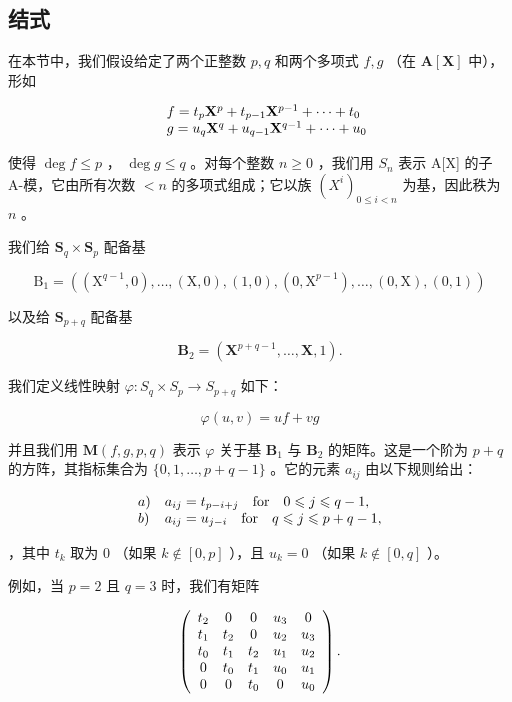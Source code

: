 \subsection{结式}

在本节中，我们假设给定了两个正整数 \(p, q\) 和两个多项式 \(f, g\) （在 \(\mathbf{A}[\mathbf{X}]\) 中），形如

\[
\begin{array}{r l} & {f = t _ {p} \mathbf {X} ^ {p} + t _ {p - 1} \mathbf {X} ^ {p - 1} + \dots + t _ {0}} \\ & {g = u _ {q} \mathbf {X} ^ {q} + u _ {q - 1} \mathbf {X} ^ {q - 1} + \dots + u _ {0}} \end{array}
\]

使得 \(\deg f \leqslant p\) ， \(\deg g \leqslant q\) 。对每个整数 \(n \geqslant 0\) ，我们用 \(S_n\) 表示 A{[}X{]} 的子 A-模，它由所有次数 \(< n\) 的多项式组成；它以族 \((X^i)_{0 \leqslant i < n}\) 为基，因此秩为 \(n\) 。

我们给 \(\mathbf{S}_q\times \mathbf{S}_p\) 配备基

\[
\mathrm{B} _ {1} = \left(\left(\mathrm{X} ^ {q - 1}, 0\right), \dots , (\mathrm{X}, 0), (1, 0), \left(0, \mathrm{X} ^ {p - 1}\right), \dots , (0, \mathrm{X}), (0, 1)\right)
\]

以及给 \(\mathbf{S}_{p + q}\) 配备基

\[
\mathbf {B} _ {2} = \left(\mathbf {X} ^ {p + q - 1}, \dots , \mathbf {X}, 1\right).
\]

我们定义线性映射 \(\varphi : S_q \times S_p \to S_{p + q}\) 如下：

\[
\varphi (u, v) = u f + v g
\]

并且我们用 \(\mathbf{M}(f,g,p,q)\) 表示 \(\varphi\) 关于基 \(\mathbf{B}_1\) 与 \(\mathbf{B}_2\) 的矩阵。这是一个阶为 \(p + q\) 的方阵，其指标集合为 \(\{0,1,\dots,p + q - 1\}\) 。它的元素 \(a_{ij}\) 由以下规则给出：

\[
\begin{array}{l l} a) & a _ {i j} = t _ {p - i + j} \quad \text {for} \quad 0 \leqslant j \leqslant q - 1, \\ b) & a _ {i j} = u _ {j - i} \quad \text {for} \quad q \leqslant j \leqslant p + q - 1, \end{array}
\]

，其中 \(t_k\) 取为 0 （如果 \(k \notin [0, p]\) ），且 \(u_k = 0\) （如果 \(k \notin [0, q]\) ）。

例如，当 \(p = 2\) 且 \(q = 3\) 时，我们有矩阵

\[
\left( \begin{array}{c c c c c} t _ {2} & 0 & 0 & u _ {3} & 0 \\ t _ {1} & t _ {2} & 0 & u _ {2} & u _ {3} \\ t _ {0} & t _ {1} & t _ {2} & u _ {1} & u _ {2} \\ 0 & t _ {0} & t _ {1} & u _ {0} & u _ {1} \\ 0 & 0 & t _ {0} & 0 & u _ {0} \end{array} \right).
\]

